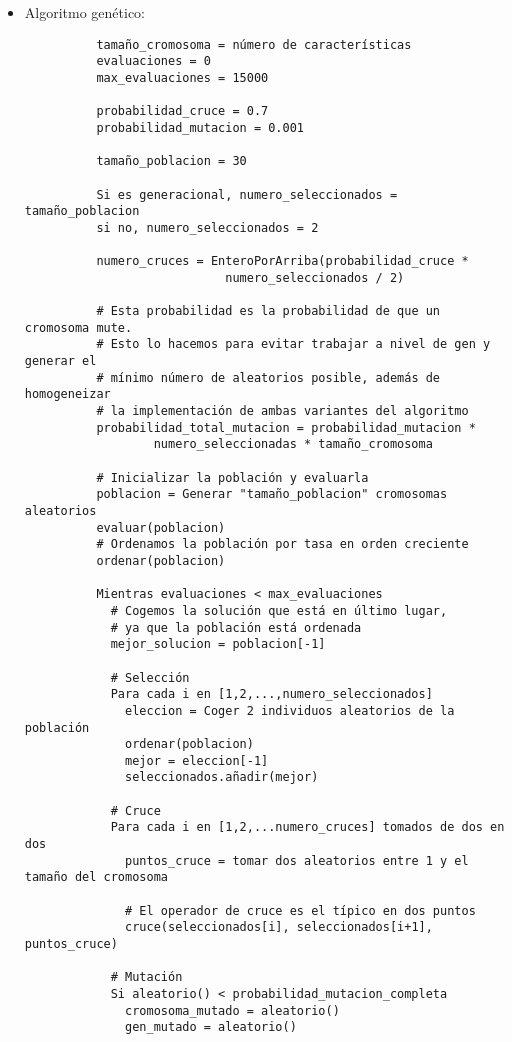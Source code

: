 \documentclass[a4paper, 11pt]{article}
\begin{document}
    \begin{itemize}
      \item Algoritmo genético:
        \begin{verbatim}
          tamaño_cromosoma = número de características
          evaluaciones = 0
          max_evaluaciones = 15000

          probabilidad_cruce = 0.7
          probabilidad_mutacion = 0.001

          tamaño_poblacion = 30

          Si es generacional, numero_seleccionados = tamaño_poblacion
          si no, numero_seleccionados = 2

          numero_cruces = EnteroPorArriba(probabilidad_cruce *
                            numero_seleccionados / 2)

          # Esta probabilidad es la probabilidad de que un cromosoma mute.
          # Esto lo hacemos para evitar trabajar a nivel de gen y generar el
          # mínimo número de aleatorios posible, además de homogeneizar
          # la implementación de ambas variantes del algoritmo
          probabilidad_total_mutacion = probabilidad_mutacion *
                  numero_seleccionadas * tamaño_cromosoma

          # Inicializar la población y evaluarla
          poblacion = Generar "tamaño_poblacion" cromosomas aleatorios
          evaluar(poblacion)
          # Ordenamos la población por tasa en orden creciente
          ordenar(poblacion)

          Mientras evaluaciones < max_evaluaciones
            # Cogemos la solución que está en último lugar,
            # ya que la población está ordenada
            mejor_solucion = poblacion[-1]

            # Selección
            Para cada i en [1,2,...,numero_seleccionados]
              eleccion = Coger 2 individuos aleatorios de la población
              ordenar(poblacion)
              mejor = eleccion[-1]
              seleccionados.añadir(mejor)

            # Cruce
            Para cada i en [1,2,...numero_cruces] tomados de dos en dos
              puntos_cruce = tomar dos aleatorios entre 1 y el tamaño del cromosoma

              # El operador de cruce es el típico en dos puntos
              cruce(seleccionados[i], seleccionados[i+1], puntos_cruce)

            # Mutación
            Si aleatorio() < probabilidad_mutacion_completa
              cromosoma_mutado = aleatorio()
              gen_mutado = aleatorio()


\end{verbatim}
\end{itemize}
\end{document}
